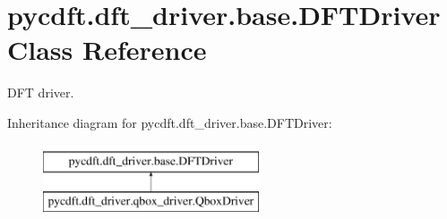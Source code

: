 \hypertarget{classpycdft_1_1dft__driver_1_1base_1_1DFTDriver}{\section{pycdft.\-dft\-\_\-driver.\-base.\-D\-F\-T\-Driver Class Reference}
\label{classpycdft_1_1dft__driver_1_1base_1_1DFTDriver}
}


D\-F\-T driver.  


Inheritance diagram for pycdft.\-dft\-\_\-driver.\-base.\-D\-F\-T\-Driver\-:\begin{figure}[H]
\begin{center}
\leavevmode
\includegraphics[height=2.000000cm]{classpycdft_1_1dft__driver_1_1base_1_1DFTDriver}
\end{center}
\end{figure}
